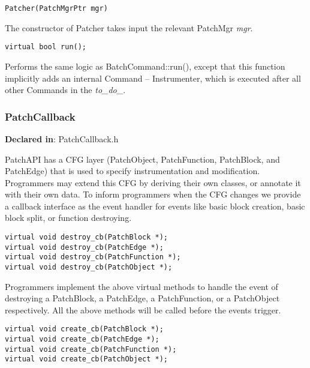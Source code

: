\begin{verbatim}
Patcher(PatchMgrPtr mgr)

\end{verbatim}



The constructor of Patcher takes input the relevant PatchMgr \emph{mgr}.


\begin{verbatim}
virtual bool run();

\end{verbatim}



Performs the same logic as BatchCommand::run(), except that this function
implicitly adds an internal Command -- Instrumenter, which is executed after all
other Commands in the \emph{to\_do\_}.

\subsubsection{PatchCallback}
\label{sec-3.2.7}

\textbf{Declared in}: PatchCallback.h

PatchAPI has a CFG layer (PatchObject, PatchFunction, PatchBlock, and PatchEdge)
that is used to specify instrumentation and modification. Programmers may extend
this CFG by deriving their own classes, or annotate it with their own data. To
inform programmers when the CFG changes we provide a callback interface as the
event handler for events like basic block creation, basic block split, or
function destroying.


\begin{verbatim}
virtual void destroy_cb(PatchBlock *);
virtual void destroy_cb(PatchEdge *);
virtual void destroy_cb(PatchFunction *);
virtual void destroy_cb(PatchObject *);

\end{verbatim}



Programmers implement the above virtual methods to handle the event of
destroying a PatchBlock, a PatchEdge, a PatchFunction, or a PatchObject
respectively. All the above methods will be called before the events trigger.


\begin{verbatim}
virtual void create_cb(PatchBlock *);
virtual void create_cb(PatchEdge *);
virtual void create_cb(PatchFunction *);
virtual void create_cb(PatchObject *);

\end{verbatim}



